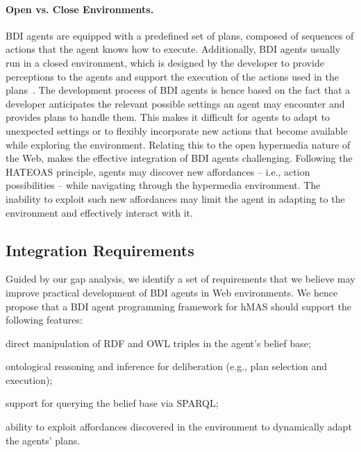 \documentclass[
]{ceurart}
\begin{document}
\paragraph{Open vs. Close Environments.}

\ac{BDI} agents are equipped with a predefined set of plans, composed of sequences of actions that the agent knows how to execute.
%
Additionally, \ac{BDI} agents usually run in a closed environment,
which is designed by the developer to provide perceptions to the agents and 
support the execution of the actions used in the plans~\cite{weyns2007aamas}. 
%
The development process of \ac{BDI} agents is hence based on the fact that a developer anticipates 
the relevant possible settings an agent may encounter and provides plans to handle them.
%
This makes it difficult for agents to adapt to unexpected settings or to flexibly incorporate new actions that become available while exploring the environment.
%
Relating this to the open hypermedia nature of the Web, makes the effective integration of \ac{BDI} agents challenging.
%
Following the \ac{HATEOAS} principle, agents may discover new affordances
-- i.e., action possibilities --
while navigating through the hypermedia environment.
%
The inability to exploit such new affordances may limit the agent in adapting to the environment and effectively interact with it.

\subsection{Integration Requirements}
\label{sec:integrating-bdi-hypermedia}

Guided by our gap analysis,
we identify a set of requirements that we believe may improve practical development of \ac{BDI} agents in Web environments.
%
We hence propose that a \ac{BDI} agent programming framework for \ac{hMAS} should support the following features:
%
\begin{enumerate*}[label=\textbf{(R\arabic*)}]
  \item direct manipulation of \ac{RDF} and \ac{OWL} triples in the agent's belief base;
  \label{req:direct}

  \item ontological reasoning and inference for deliberation (e.g., plan selection and execution);
  \label{req:reasoning}

  \item support for querying the belief base via \acs{SPARQL};
  \label{req:query}

  \item ability to exploit affordances discovered in the environment to dynamically adapt the agents' plans.
  \label{req:actions}
\end{enumerate*}
\end{document}
